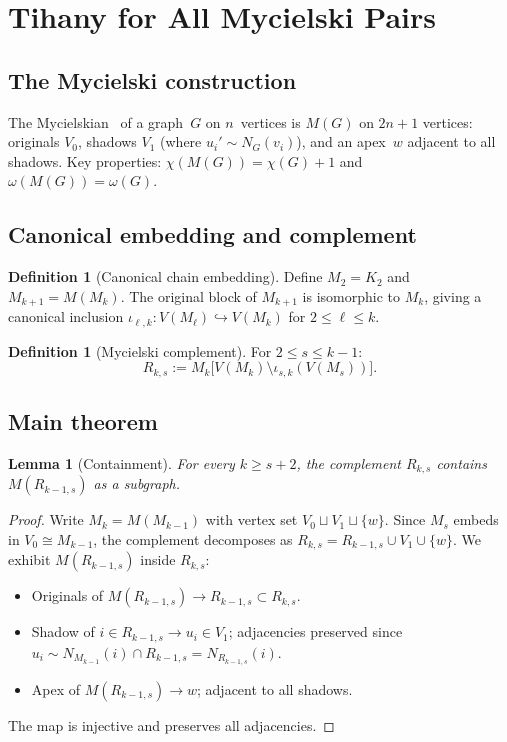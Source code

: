 \documentclass[11pt]{amsart}
\newtheorem{lemma}[theorem]{Lemma}
\theoremstyle{definition}
\newtheorem{definition}[theorem]{Definition}
\theoremstyle{remark}
\begin{document}
\section{Tihany for All Mycielski Pairs}\label{sec:mycielski}

\subsection{The Mycielski construction}

The Mycielskian~\cite{mycielski-1955} of a graph~$G$ on $n$~vertices 
is $M(G)$ on $2n+1$ vertices: originals $V_0$, shadows $V_1$ 
(where $u_i' \sim N_G(v_i)$), and an apex~$w$ adjacent to all shadows.  
Key properties: $\chi(M(G)) = \chi(G) + 1$ and $\omega(M(G)) = \omega(G)$.

\subsection{Canonical embedding and complement}

\begin{definition}[Canonical chain embedding]\label{def:canonical}
Define $M_2 = K_2$ and $M_{k+1} = M(M_k)$.  The original block of 
$M_{k+1}$ is isomorphic to $M_k$, giving a canonical inclusion 
$\iota_{\ell,k}\colon V(M_\ell) \hookrightarrow V(M_k)$ for 
$2 \le \ell \le k$.
\end{definition}

\begin{definition}[Mycielski complement]\label{def:complement}
For $2 \le s \le k-1$:
\[
  R_{k,s} := M_k\bigl[V(M_k) \setminus \iota_{s,k}(V(M_s))\bigr].
\]
\end{definition}

\subsection{Main theorem}

\begin{lemma}[Containment]\label{lem:containment}
For every $k \ge s + 2$, the complement $R_{k,s}$ contains $M(R_{k-1,s})$ 
as a subgraph.
\end{lemma}

\begin{proof}
Write $M_k = M(M_{k-1})$ with vertex set $V_0 \sqcup V_1 \sqcup \{w\}$.  
Since $M_s$ embeds in $V_0 \cong M_{k-1}$, the complement decomposes as 
$R_{k,s} = R_{k-1,s} \cup V_1 \cup \{w\}$.  We exhibit $M(R_{k-1,s})$ 
inside $R_{k,s}$:
\begin{itemize}
\item Originals of $M(R_{k-1,s}) \to R_{k-1,s} \subset R_{k,s}$.
\item Shadow of $i \in R_{k-1,s} \to u_i \in V_1$; adjacencies preserved 
  since $u_i \sim N_{M_{k-1}}(i) \cap R_{k-1,s} = N_{R_{k-1,s}}(i)$.
\item Apex of $M(R_{k-1,s}) \to w$; adjacent to all shadows.
\end{itemize}
The map is injective and preserves all adjacencies.
\end{proof}
\end{document}

